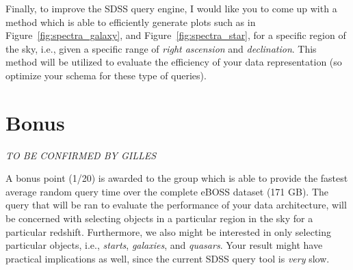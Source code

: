 Finally, to improve the SDSS query engine, I would like you to come up with a method which is able to efficiently generate plots such as in Figure~\ref{fig:spectra_galaxy}, and Figure~\ref{fig:spectra_star}, for a specific region of the sky, i.e., given a specific range of \emph{right ascension} and \emph{declination}. This method will be utilized to evaluate the efficiency of your data representation (so optimize your schema for these type of queries).

\section{Bonus}
\label{sec:bonus}

\emph{TO BE CONFIRMED BY GILLES}

A bonus point (1/20) is awarded to the group which is able to provide the fastest average random query time over the complete eBOSS dataset (171 GB). The query that will be ran to evaluate the performance of your data architecture, will be concerned with selecting objects in a particular region in the sky for a particular redshift. Furthermore, we also might be interested in only selecting particular objects, i.e., \emph{starts}, \emph{galaxies}, and \emph{quasars}. Your result might have practical implications as well, since the current SDSS query tool is \emph{very} slow.


